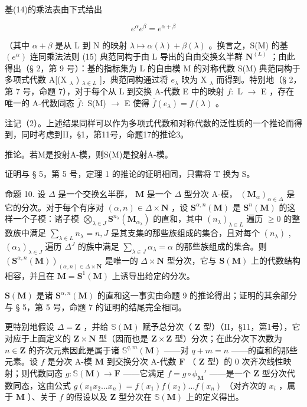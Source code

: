 基(14)的乘法表由下式给出

\[
e ^ {\alpha} e ^ {\beta} = e ^ {\alpha + \beta}\tag{15}
\]

（其中 \(\alpha + \beta\) 是从 L 到 N 的映射 \(\lambda \mapsto \alpha(\lambda) + \beta(\lambda)\) 。换言之，S(M) 的基 \((e^{\alpha})\) 连同乘法法则 (15) 典范同构于由 L 导出的自由交换幺半群 \(\mathbf{N}^{(L)}\) ；由此得出（§ 2，第 9 号）：基的指标集为 L 的自由模 M 的对称代数 S(M) 典范同构于多项式代数 A{[}(X \(_{\lambda}\) ) \(_{\lambda \in L}\) {]}，典范同构通过将 \(e_{\lambda}\) 映为 X \(_{\lambda}\) 而得到。特别地（§ 2，第 7 号，命题 7），对于每个从 L 到交换 A-代数 E 中的映射 \(f\colon\) L \(\to\) E ，存在唯一的 A-代数同态 \(\bar{f}\colon\) S(M) \(\to\) E 使得 \(\bar{f}(e_{\lambda}) = f(\lambda)\) 。

注记（2）。上述结果同样可以作为多项式代数和对称代数的泛性质的一个推论而得到，同时考虑到II，§1，第11号，命题17的推论3。

推论。若M是投射A-模，则S(M)是投射A-模。

证明与 § 5，第 5 号，定理 1 的推论的证明相同，只需将 T 换为 S。

命题 10. 设 \(\Delta\) 是一个交换幺半群， \(\mathbf{M}\) 是一个 \(\Delta\) 型分次 A-模， \((\mathbf{M}_{\alpha})_{\alpha \in \Delta}\) 是它的分次。对于每个有序对 \((\alpha, n) \in \Delta \times \mathbf{N}\) ，设 \(\mathbf{S}^{\alpha, n}(\mathbf{M})\) 是 \(\mathbf{S}^n(\mathbf{M})\) 的这样一个子模：诸子模 \(\bigotimes_{\lambda \in J} \mathbf{S}^{n_{\lambda}}(\mathbf{M}_{\alpha_{\lambda}})\) 的直和，其中 \((n_{\lambda})_{\lambda \in L}\) 遍历 \(\geqslant 0\) 的整数族中满足 \(\sum_{\lambda \in L} n_{\lambda} = n, J\) 是其支集的那些族组成的集合，且对每个 \((n_{\lambda})\) , \((\alpha_{\lambda})_{\lambda \in J}\) 遍历 \(\Delta^J\) 的族中满足 \(\sum_{\lambda \in J} \alpha_{\lambda} = \alpha\) 的那些族组成的集合。则 \((\mathbf{S}^{\alpha, n}(\mathbf{M}))_{(\alpha, n) \in \Delta \times \mathbf{N}}\) 是唯一的 \(\Delta \times \mathbf{N}\) 型分次，它与 \(\mathbf{S}(\mathbf{M})\) 上的代数结构相容，并且在 \(\mathbf{M} = \mathbf{S}^1(\mathbf{M})\) 上诱导出给定的分次。

\(\mathbf{S}(\mathbf{M})\) 是诸 \(\mathbf{S}^{\alpha,n}(\mathbf{M})\) 的直和这一事实由命题 9 的推论得出；证明的其余部分与 § 5，第 5 号，命题 7 的证明的结尾完全相同。

更特别地假设 \(\Delta = \mathbf{Z}\) ，并给 \(\mathbb{S}(\mathbf{M})\) 赋予总分次（ \(\mathbf{Z}\) 型）（II，§11，第1号），它对应于上面定义的 \(\mathbf{Z} \times \mathbf{N}\) 型（因而也是 \(\mathbf{Z} \times \mathbf{Z}\) 型）分次；在此分次下次数为 \(n \in \mathbf{Z}\) 的齐次元素因此是属于诸 \(\mathbb{S}^{q, m}(\mathbf{M})\) ——对 \(q + m = n\) ——的直和的那些元素。设 \(f\) 是分次 A-模 \(\mathbf{M}\) 到交换分次 A-代数 \(\mathbf{F}\) （ \(\mathbf{Z}\) 型）的 0 次齐次线性映射；则代数同态 \(g: \mathbb{S}(\mathbf{M}) \to \mathbf{F}\) ——它满足 \(f = g \circ \phi_{\mathbf{M}}'\) ——是一个 \(\mathbf{Z}\) 型分次代数同态，这由公式 \(g(x_1 x_2 \ldots x_n) = f(x_1) f(x_2) \ldots f(x_n)\) （对齐次的 \(x_i\) ，属于 \(\mathbf{M}\) ）、关于 \(f\) 的假设以及 \(\mathbf{Z}\) 型分次在 \(\mathbb{S}(\mathbf{M})\) 上的定义得出。

